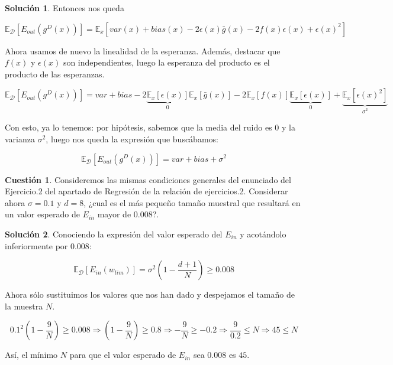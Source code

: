 \documentclass[a4paper, 11pt]{article}
\theoremstyle{definition}
\newtheorem{cuestion}{Cuestión}
\newtheorem*{solucion}{Solución}
\begin{document}
\begin{solucion}
    Entonces nos queda

    $$ \mathbb{E}_{\mathcal{D}}[E_{out}(g^D(x))] = \mathbb{E}_x \left[var(x) + bias(x) - 2 \epsilon(x) \bar{g}(x) - 2f(x)\epsilon(x) + \epsilon(x)^2 \right] $$

    Ahora usamos de nuevo la linealidad de la esperanza. Además, destacar que $f(x)$ y $\epsilon(x)$ son independientes, luego la esperanza del producto es el producto de las esperanzas.

    $$ \mathbb{E}_{\mathcal{D}}[E_{out}(g^D(x))] = var + bias -2 \underbrace{\mathbb{E}_x \left[ \epsilon(x) \right]}_{0} \mathbb{E}_x \left[\bar{g}(x) \right] - 2 \mathbb{E}_x \left[ f(x) \right] \underbrace{\mathbb{E}_x \left[ \epsilon(x) \right]}_{0} + \underbrace{\mathbb{E}_x \left[\epsilon(x)^2 \right]}_{\sigma^2} $$

    Con esto, ya lo tenemos: por hipótesis, sabemos que la media del ruido es 0 y la varianza $\sigma^2$, luego nos queda la expresión que buscábamos:

    $$ \mathbb{E}_{\mathcal{D}}[E_{out}(g^D(x))] = var + bias + \sigma^2 $$



  \end{solucion}

  \begin{cuestion}
    Consideremos las mismas condiciones generales del enunciado del Ejercicio.2 del apartado de Regresión de la relación de ejercicios.2. Considerar ahora $\sigma=0.1$ y $d=8$, ¿cual es el más pequeño tamaño muestral que resultará en un valor esperado de $E_{in}$ mayor de $0.008$?.
  \end{cuestion}


  \begin{solucion}
    Conociendo la expresión del valor esperado del $E_{in}$ y acotándolo inferiormente por $0.008$:

    $$\mathbb{E}_{\mathcal{D}} \left[ E_{in}(w_{lim})\right] = \sigma^2 \left(1 - \frac{d+1}{N}\right) \geq 0.008$$

    Ahora sólo sustituimos los valores que nos han dado y despejamos el tamaño de la muestra $N$.

    $$0.1^2 \left(1 - \frac{9}{N}\right) \geq 0.008 \Rightarrow \left(1 - \frac{9}{N}\right) \geq 0.8 \Rightarrow -\frac{9}{N} \geq -0.2 \Rightarrow \frac{9}{0.2} \leq N \Rightarrow 45 \leq N$$

    Así, el mínimo $N$ para que el valor esperado de $E_{in}$ sea $0.008$ es $45$.
  \end{solucion}
\end{document}
